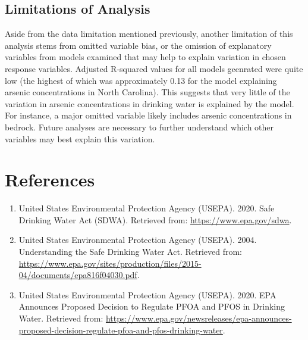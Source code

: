 \documentclass[12pt,]{article}
\providecommand{\tightlist}{%
  \setlength{\itemsep}{0pt}\setlength{\parskip}{0pt}}
\begin{document}
\hypertarget{limitations-of-analysis}{%
\subsection{Limitations of Analysis}\label{limitations-of-analysis}}

Aside from the data limitation mentioned previously, another limitation
of this analysis stems from omitted variable bias, or the omission of
explanatory variables from models examined that may help to explain
variation in chosen response variables. Adjusted R-squared values for
all models geenrated were quite low (the highest of which was
approximately 0.13 for the model explaining arsenic concentrations in
North Carolina). This suggests that very little of the variation in
arsenic concentrations in drinking water is explained by the model. For
instance, a major omitted variable likely includes arsenic
concentrations in bedrock. Future analyses are necessary to further
understand which other variables may best explain this variation.

\newpage

\hypertarget{references}{%
\section{References}\label{references}}

\begin{enumerate}
\def\labelenumi{\arabic{enumi}.}
\tightlist
\item
  United States Environmental Protection Agency (USEPA). 2020. Safe
  Drinking Water Act (SDWA). Retrieved from:
  \url{https://www.epa.gov/sdwa}.
\item
  United States Environmental Protection Agency (USEPA). 2004.
  Understanding the Safe Drinking Water Act. Retrieved from:
  \url{https://www.epa.gov/sites/production/files/2015-04/documents/epa816f04030.pdf}.
\item
  United States Environmental Protection Agency (USEPA). 2020. EPA
  Announces Proposed Decision to Regulate PFOA and PFOS in Drinking
  Water. Retrieved from:
  \url{https://www.epa.gov/newsreleases/epa-announces-proposed-decision-regulate-pfoa-and-pfos-drinking-water}.
\end{enumerate}
\end{document}

